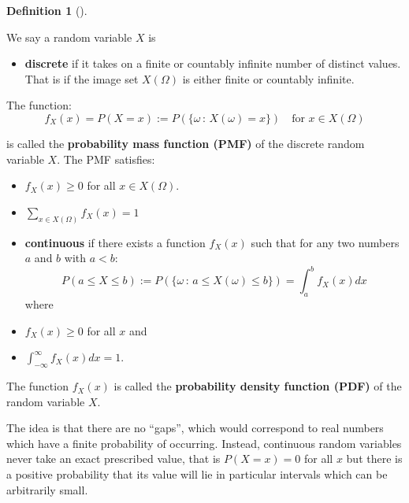 \documentclass[
  letterpaper,
  DIV=11,
  numbers=noendperiod]{scrreport}
\providecommand{\tightlist}{%
  \setlength{\itemsep}{0pt}\setlength{\parskip}{0pt}}
\theoremstyle{definition}
\theoremstyle{plain}
\theoremstyle{plain}
\theoremstyle{definition}
\newtheorem{definition}{Definition}[chapter]
\theoremstyle{remark}
\begin{document}
\begin{tcolorbox}[enhanced jigsaw, opacitybacktitle=0.6, bottomtitle=1mm, opacityback=0, toprule=.15mm, colbacktitle=quarto-callout-note-color!10!white, colback=white, left=2mm, title={Discrete and continuous random variables}, breakable, rightrule=.15mm, leftrule=.75mm, titlerule=0mm, colframe=quarto-callout-note-color-frame, arc=.35mm, coltitle=black, toptitle=1mm, bottomrule=.15mm]

\begin{definition}[]\protect\hypertarget{def-discrete-continuous-random-variable}{}\label{def-discrete-continuous-random-variable}

We say a random variable \(X\) is

\begin{itemize}
\tightlist
\item
  \textbf{discrete} if it takes on a finite or countably infinite number
  of distinct values. That is if the image set \(X(\Omega)\) is either
  finite or countably infinite.
\end{itemize}

The function: \[
f_X(x) = P(X=x):=P(\{\omega\,:\,X(\omega)=x\})\quad  \mbox{for } x\in X(\Omega)
\]

is called the \textbf{probability mass function (PMF)} of the discrete
random variable \(X\). The PMF satisfies:

\begin{itemize}
\item
  \(f_X(x) \ge 0\) for all \(x \in X(\Omega)\).
\item
  \(\sum_{x \in X(\Omega)} f_X(x) = 1\)
\item
  \textbf{continuous} if there exists a function \(f_X(x)\) such that
  for any two numbers \(a\) and \(b\) with \(a < b\):
  \[ P(a \le X \le b):=P(\{\omega\,:\, a \leq X(\omega)\leq b\}) = \int_a^b f_X(x) dx \]
  where
\item
  \(f_X(x) \ge 0\) for all \(x\) and
\item
  \(\int_{-\infty}^{\infty} f_X(x) dx = 1\).
\end{itemize}

The function \(f_X(x)\) is called the \textbf{probability density
function (PDF)} of the random variable \(X\).

\end{definition}

\end{tcolorbox}

The idea is that there are no ``gaps'', which would correspond to real
numbers which have a finite probability of occurring. Instead,
continuous random variables never take an exact prescribed value, that
is \(P(X=x)=0\) for all \(x\) but there is a positive probability that
its value will lie in particular intervals which can be arbitrarily
small.
\end{document}
